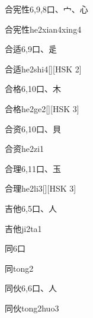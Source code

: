 \begin{entry}{合宪性}{6,9,8}{⼝、⼧、⼼}
  \begin{phonetics}{合宪性}{he2xian4xing4}
  \end{phonetics}
\end{entry}

\begin{entry}{合适}{6,9}{⼝、⾡}
  \begin{phonetics}{合适}{he2shi4}[][HSK 2]
  \end{phonetics}
\end{entry}

\begin{entry}{合格}{6,10}{⼝、⽊}
  \begin{phonetics}{合格}{he2ge2}[][HSK 3]
  \end{phonetics}
\end{entry}

\begin{entry}{合资}{6,10}{⼝、⾙}
  \begin{phonetics}{合资}{he2zi1}
  \end{phonetics}
\end{entry}

\begin{entry}{合理}{6,11}{⼝、⽟}
  \begin{phonetics}{合理}{he2li3}[][HSK 3]
  \end{phonetics}
\end{entry}

\begin{entry}{吉他}{6,5}{⼝、⼈}
  \begin{phonetics}{吉他}{ji2ta1}
  \end{phonetics}
\end{entry}

\begin{entry}{同}{6}{⼝}
  \begin{phonetics}{同}{tong2}
  \end{phonetics}
\end{entry}

\begin{entry}{同伙}{6,6}{⼝、⼈}
  \begin{phonetics}{同伙}{tong2huo3}
  \end{phonetics}
\end{entry}

